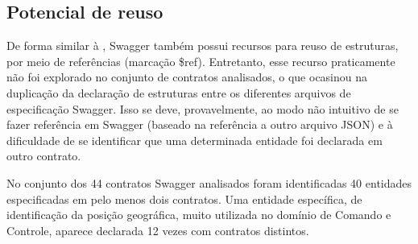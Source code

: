 \subsection{Potencial de reuso}

De forma similar à \neoidl{}, Swagger também possui recursos para reuso de
estruturas, por meio de referências (marcação \$ref). Entretanto, esse recurso
praticamente não foi explorado no conjunto de contratos analisados, o que
ocasinou na duplicação da declaração de estruturas entre os diferentes arquivos
de especificação Swagger. Isso se deve, provavelmente, ao modo não intuitivo de
se fazer referência em Swagger (baseado na referência a outro arquivo JSON) e à
dificuldade de se identificar que uma determinada entidade foi declarada em
outro contrato.

No conjunto dos 44 contratos Swagger analisados foram identificadas 40 entidades
especificadas em pelo menos dois contratos. Uma entidade específica, de
identificação da posição geográfica, muito utilizada no domínio de Comando e Controle, aparece
declarada 12 vezes com contratos distintos.

